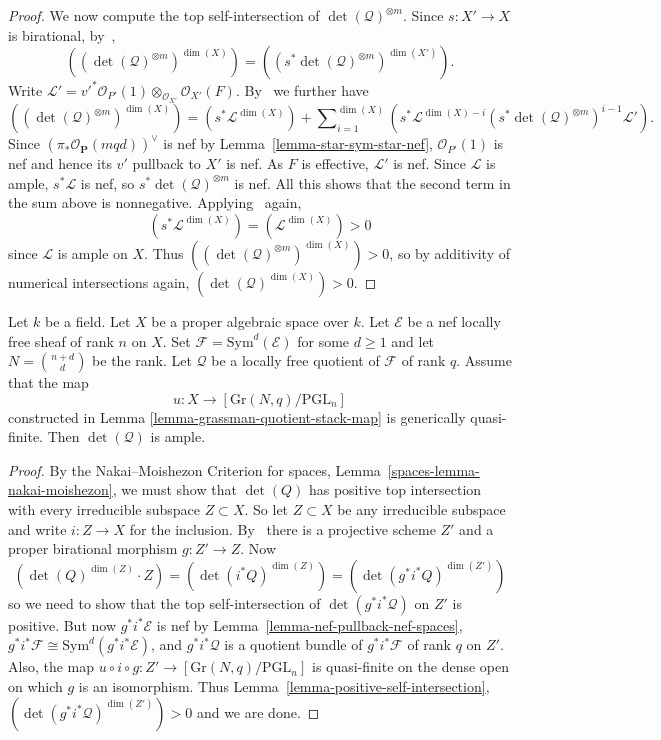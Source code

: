 \begin{proof}
We now compute the top self-intersection of $\det(\mathcal{Q})^{\otimes m}$.
Since $s : X' \to X$ is birational, by~,
$$
  ((\det(\mathcal{Q})^{\otimes m})^{\dim(X)})
    = ((s^*\det(\mathcal{Q})^{\otimes m})^{\dim(X')}).
$$
Write
$\mathcal{L}'
  = v'^*\mathcal{O}_{P'}(1) \otimes_{\mathcal{O}_{X'}} \mathcal{O}_{X'}(F)$.
By~ we further have
$$
  ((\det(\mathcal{Q})^{\otimes m})^{\dim(X)})
    = (s^*\mathcal{L}^{\dim(X)})
      + \sum\nolimits_{i = 1}^{\dim(X)}
          (s^*\mathcal{L}^{\dim(X) - i} (s^*\det(\mathcal{Q})^{\otimes m})^{i - 1} \mathcal{L}').
$$
Since $(\pi_*\mathcal{O}_{\mathbf{P}}(mqd))^\vee$ is nef by
Lemma~\ref{lemma-star-sym-star-nef},
$\mathcal{O}_{P'}(1)$ is nef and hence its $v'$ pullback to $X'$ is nef.
As $F$ is effective, $\mathcal{L}'$ is nef.
Since $\mathcal{L}$ is ample, $s^*\mathcal{L}$ is nef, so
$s^*\det(\mathcal{Q})^{\otimes m}$ is nef.
All this shows that the second term in the sum above is nonnegative.
Applying~ again,
$$
  (s^*\mathcal{L}^{\dim(X)}) = (\mathcal{L}^{\dim(X)}) > 0
$$
since $\mathcal{L}$ is ample on $X$.
Thus $((\det(\mathcal{Q})^{\otimes m})^{\dim(X)}) > 0$, so by additivity of
numerical intersections again, $(\det(\mathcal{Q})^{\dim(X)}) > 0$.
\end{proof}

\begin{lemma}
\label{lemma-ampleness-of-semipos-quotients}
Let $k$ be a field.
Let $X$ be a proper algebraic space over $k$.
Let $\mathcal{E}$ be a nef locally free sheaf of rank $n$ on $X$.
Set $\mathcal{F} = \mathrm{Sym}^d(\mathcal{E})$ for some $d \geq 1$ and
let $N = \binom{n + d}{d}$ be the rank.
Let $\mathcal{Q}$ be a locally free quotient of $\mathcal{F}$ of rank $q$.
Assume that the map
$$
u : X \to [\mathrm{Gr}(N,q)/\mathrm{PGL}_n]
$$
constructed in Lemma \ref{lemma-grassman-quotient-stack-map}
is generically quasi-finite.
Then $\det(\mathcal{Q})$ is ample.
\end{lemma}

\begin{proof}
By the Nakai--Moishezon Criterion for spaces,
Lemma~\ref{spaces-lemma-nakai-moishezon},
we must show that $\det(Q)$ has positive top intersection with every
irreducible subspace $Z \subset X$.
So let $Z \subset X$ be any irreducible subspace and write $i : Z \to X$ for
the inclusion.
By~ there is a projective scheme $Z'$ and a proper birational
morphism $g : Z' \to Z$.
Now
$$
  (\det(Q)^{\dim(Z)} \cdot Z)
    = (\det(i^*Q)^{\dim(Z)})
    = (\det(g^*i^*Q)^{\dim(Z')})
$$
so we need to show that the top self-intersection of $\det(g^*i^*\mathcal{Q})$
on $Z'$ is positive.
But now $g^*i^*\mathcal{E}$ is nef by Lemma~\ref{lemma-nef-pullback-nef-spaces},
$g^*i^*\mathcal{F} \cong \mathrm{Sym}^d(g^*i^*\mathcal{E})$,
and $g^*i^*\mathcal{Q}$ is a quotient bundle of $g^*i^*\mathcal{F}$ of rank $q$
on $Z'$.
Also, the map $u \circ i \circ g : Z' \to [\mathrm{Gr}(N,q)/\mathrm{PGL}_n]$
is quasi-finite on the dense open on which $g$ is an isomorphism.
Thus Lemma~\ref{lemma-positive-self-intersection},
$(\det(g^*i^*\mathcal{Q})^{\dim(Z')}) > 0$ and we are done.
\end{proof}


